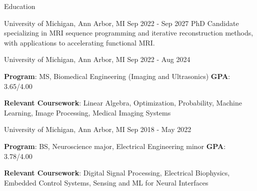 \documentclass{resume}
\begin{document}
\begin{rSection}{Education}
\begin{rSubsection}{University of Michigan}{, Ann Arbor, MI \hfill {Sep 2022 - Sep 2027}}
	PhD Candidate specializing in MRI sequence programming and iterative reconstruction methods, with applications to accelerating functional MRI.
\end{rSubsection}
\begin{rSubsection}{University of Michigan}{, Ann Arbor, MI \hfill {Sep 2022 - Aug 2024}}
	\item \textbf{Program}: MS, Biomedical Engineering (Imaging and Ultrasonics) \hfill{\textbf{GPA}: 3.65/4.00}
    \item{\textbf{Relevant Coursework}: Linear Algebra, Optimization, Probability, Machine Learning, Image Processing, Medical Imaging Systems}
\end{rSubsection}
\begin{rSubsection}{University of Michigan}{, Ann Arbor, MI \hfill {Sep 2018 - May 2022}}
	\item{\textbf{Program}: BS, Neuroscience major, Electrical Engineering minor} \hfill{\textbf{GPA}: 3.78/4.00}
    \item{\textbf{Relevant Coursework}: Digital Signal Processing, Electrical Biophysics, Embedded Control Systems, Sensing and ML for Neural Interfaces}
\end{rSubsection}
\end{rSection}
\end{document}
